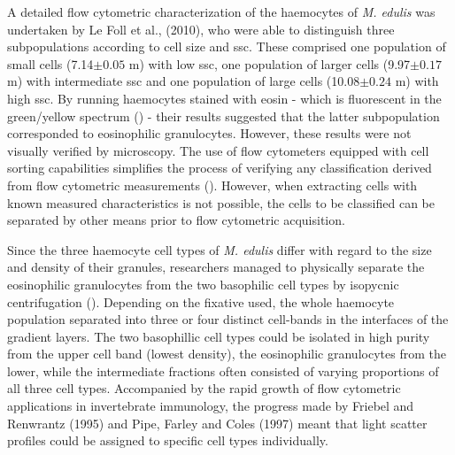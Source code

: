 A detailed flow cytometric characterization of the haemocytes of \emph{M. edulis} was undertaken by Le Foll et al., (2010), who were able to distinguish three subpopulations according to cell size and \acrshort{ssc}. These comprised one population of small cells (7.14$\pm{0.05}$ \micro m) with low \acrshort{ssc}, one population of larger cells (9.97$\pm{0.17}$ \micro m) with intermediate \acrshort{ssc} and one population of large cells (10.08$\pm{0.24}$ \micro m) with high \acrshort{ssc}. By running haemocytes stained with eosin - which is fluorescent in the green/yellow spectrum (\cite{Elfer2016, Koegle2020}) - their results suggested that the latter subpopulation corresponded to eosinophilic granulocytes. However, these results were not visually verified by microscopy. The use of flow cytometers equipped with cell sorting capabilities simplifies the process of verifying any classification derived from flow cytometric measurements (\cite{Shapiro2004}). However, when extracting cells with known measured characteristics is not possible, the cells to be classified can be separated by other means prior to flow cytometric acquisition.

Since the three haemocyte cell types of \emph{M. edulis} differ with regard to the size and density of their granules, researchers managed to physically separate the eosinophilic granulocytes from the two basophilic cell types by isopycnic centrifugation (\cite{Friebel1995, Pipe1997}). Depending on the fixative used, the whole haemocyte population separated into three or four distinct cell-bands in the interfaces of the gradient layers. The two basophillic cell types could be isolated in high purity from the upper cell band (lowest density), the eosinophilic granulocytes from the lower, while the intermediate fractions often consisted of varying proportions of all three cell types. Accompanied by the rapid growth of flow cytometric applications in invertebrate immunology, the progress made by Friebel and Renwrantz (1995) and Pipe, Farley and Coles (1997) meant that light scatter profiles could be assigned to specific cell types individually.


